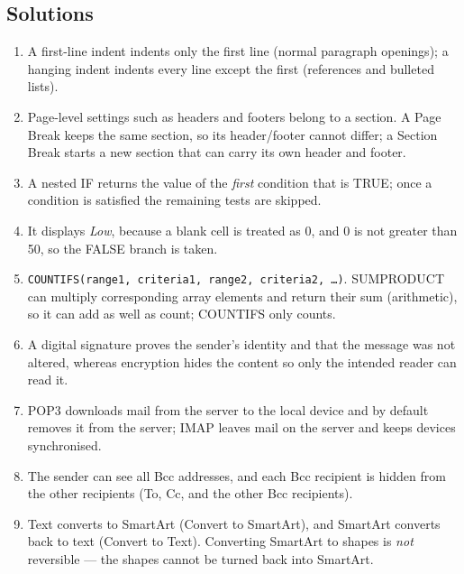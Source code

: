 \documentclass[11pt]{article}
\begin{document}
\subsection*{Solutions}
\begingroup\small
\begin{enumerate}[label=\arabic*.]
  \item A first-line indent indents only the first line (normal paragraph
    openings); a hanging indent indents every line except the first
    (references and bulleted lists).
  \item Page-level settings such as headers and footers belong to a section.
    A Page Break keeps the same section, so its header/footer cannot differ;
    a Section Break starts a new section that can carry its own header and
    footer.
  \item A nested IF returns the value of the \emph{first} condition that is
    TRUE; once a condition is satisfied the remaining tests are skipped.
  \item It displays \emph{Low}, because a blank cell is treated as 0, and 0 is
    not greater than 50, so the FALSE branch is taken.
  \item \texttt{COUNTIFS(range1, criteria1, range2, criteria2, \ldots)}.
    SUMPRODUCT can multiply corresponding array elements and return their sum
    (arithmetic), so it can add as well as count; COUNTIFS only counts.
  \item A digital signature proves the sender's identity and that the message
    was not altered, whereas encryption hides the content so only the
    intended reader can read it.
  \item POP3 downloads mail from the server to the local device and by
    default removes it from the server; IMAP leaves mail on the server and
    keeps devices synchronised.
  \item The sender can see all Bcc addresses, and each Bcc recipient is hidden
    from the other recipients (To, Cc, and the other Bcc recipients).
  \item Text converts to SmartArt (Convert to SmartArt), and SmartArt
    converts back to text (Convert to Text). Converting SmartArt to shapes is
    \emph{not} reversible --- the shapes cannot be turned back into SmartArt.
\end{enumerate}
\endgroup
\end{document}
